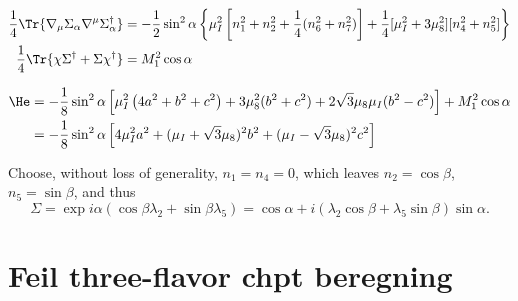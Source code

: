 \documentclass{book}
\begin{document}
%
\begin{align}
    \frac{1}{4} \Tr{\nabla_\mu \Sigma_\alpha \nabla^\mu \Sigma_\alpha^\dagger}
    & = -\frac{1}{2} \sin^2 \alpha
    \left\{
        \mu_I^2 \left[n_1^2 + n_2^2 + \frac{1}{4}(n_6^2 + n_7^2)\right]
        + \frac{1}{4} [\mu_I^2 + 3 \mu_8^2][n_4^2 + n_5^2] 
    \right\} \\
    \frac{1}{4} \Tr{\chi \Sigma^\dagger + \Sigma \chi^\dagger} 
    & = M_1^2 \cos \alpha
\end{align}


\begin{align}
    \He
    &= -\frac{1}{8} \sin^2 \alpha 
    \left[
        \mu_I^2 \left(4a^2 + b^2 + c^2\right) 
        + 3 \mu_8^2 (b^2 + c^2)
        + 2 \sqrt{3} \mu_8 \mu_I (b^2 - c^2)
    \right]
    + M_1^2 \cos\alpha\\
    &= -\frac{1}{8} \sin^2\alpha
    \left[
        4 \mu_I^2 a^2  + (\mu_I + \sqrt 3 \mu_8 )^2b^2 + (\mu_I - \sqrt 3 \mu_8)^2c^2  
    \right]
\end{align}



Choose, without loss of generality, $n_1 = n_4 = 0$, which leaves $n_2 = \cos\beta$, $n_5 = \sin\beta$, and thus
%
\begin{equation}
    \Sigma = \exp{i \alpha (\cos\beta \lambda_2 + \sin\beta \lambda_5) }
    = \cos\alpha + i (\lambda_2 \cos\beta + \lambda_5 \sin\beta)\sin\alpha.
\end{equation}
%


\section{Feil three-flavor chpt beregning}
\end{document}
